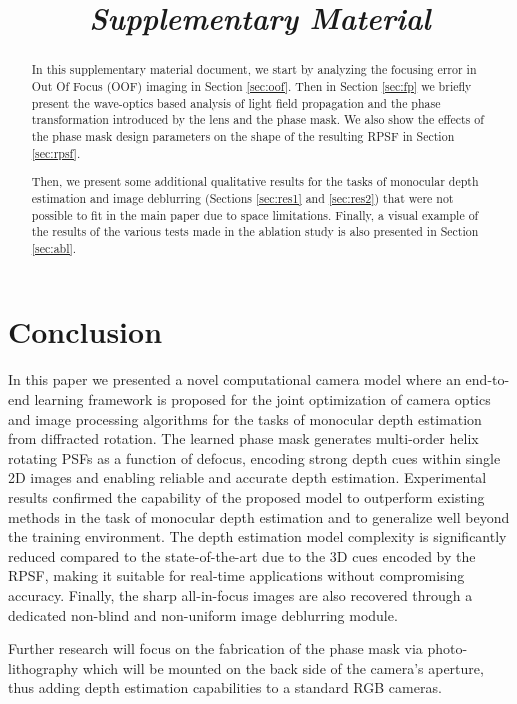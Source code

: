 \documentclass[preprint,5p,twocolumn]{elsarticle}
\begin{document}
 \section{Conclusion}
In this paper we presented  a novel computational camera model where an end-to-end learning framework is proposed for the joint optimization of camera optics and image processing algorithms for the tasks of monocular depth estimation from diffracted rotation. The learned phase mask generates multi-order helix rotating PSFs as a function of defocus, encoding strong depth cues within single 2D images and enabling reliable and accurate depth estimation. Experimental results confirmed the capability of the proposed model to outperform existing methods in the task of monocular depth estimation and to generalize well beyond the training environment. The depth estimation model complexity is significantly reduced compared to the state-of-the-art due to the 3D cues encoded by the RPSF, making it suitable for real-time applications without compromising accuracy. Finally, the sharp all-in-focus images are also recovered through a dedicated non-blind and non-uniform image deblurring module.

Further research will focus on the fabrication of the phase mask via photo-lithography which will be mounted on the back side of the camera's aperture, thus adding depth estimation capabilities to a standard RGB cameras. 



\begin{frontmatter}

\title{\\ \textit{Supplementary Material}}


\begin{abstract}
In this supplementary material document, we start by analyzing the focusing error in Out Of Focus (OOF) imaging in Section \ref{sec:oof}.  
Then in Section \ref{sec:fp} we briefly present the wave-optics based analysis of light field propagation and  the phase transformation introduced by the lens and the phase mask. 
We also show the effects of the phase mask design parameters on the shape of the resulting RPSF in Section \ref{sec:rpsf}. 

Then, we present some additional qualitative results for the tasks of monocular depth estimation and image deblurring (Sections \ref{sec:res1} and \ref{sec:res2}) that were not possible to fit in the main paper due to space limitations. Finally, a visual example of the results of the various tests made in the ablation study is also presented in Section \ref{sec:abl}.
\end{abstract}

\end{frontmatter}
\end{document}
